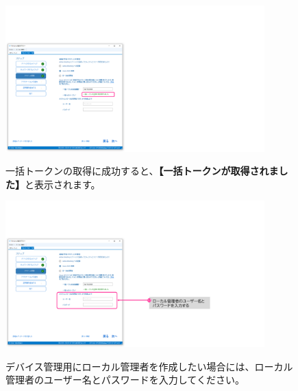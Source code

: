 \begin{figure}[hp]
    \begin{minipage}{0.6\textwidth}
        \vspace{-1cm}
        \includegraphics[width=10cm]{figures/MakeProvisioningPackage-12}
    \end{minipage}
    \begin{minipage}{0.4\textwidth}
        一括トークンの取得に成功すると、\textbf{【一括トークンが取得されました】}と表示されます。
    \end{minipage}
\end{figure}

\begin{figure}[hp]
    \begin{minipage}{0.6\textwidth}
        \vspace{-1cm}
        \includegraphics[width=10cm]{figures/MakeProvisioningPackage-13}
    \end{minipage}
    \begin{minipage}{0.4\textwidth}
        デバイス管理用にローカル管理者を作成したい場合には、ローカル管理者のユーザー名とパスワードを入力してください。
    \end{minipage}
\end{figure}

